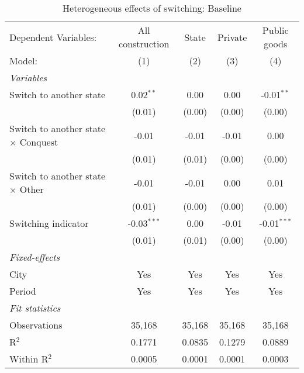 \begin{table}[htbp]
   \caption{\label{tab:baseline_10y} Heterogeneous effects of switching: Baseline}
   \centering
   \begin{tabular}{lcccc}
      \tabularnewline \midrule \midrule
      Dependent Variables:                       & All construction & State  & Private & Public goods\\  
      Model:                                     & (1)              & (2)    & (3)     & (4)\\  
      \midrule
      \emph{Variables}\\
      Switch to another state                    & 0.02$^{**}$      & 0.00   & 0.00    & -0.01$^{**}$\\   
                                                 & (0.01)           & (0.00) & (0.00)  & (0.00)\\   
      Switch to another state $\times$ Conquest  & -0.01            & -0.01  & -0.01   & 0.00\\   
                                                 & (0.01)           & (0.01) & (0.00)  & (0.00)\\   
      Switch to another state $\times$ Other     & -0.01            & -0.01  & 0.00    & 0.01\\   
                                                 & (0.01)           & (0.00) & (0.00)  & (0.00)\\   
      Switching indicator                        & -0.03$^{***}$    & 0.00   & -0.01   & -0.01$^{***}$\\   
                                                 & (0.01)           & (0.01) & (0.00)  & (0.00)\\   
      \midrule
      \emph{Fixed-effects}\\
      City                                       & Yes              & Yes    & Yes     & Yes\\  
      Period                                     & Yes              & Yes    & Yes     & Yes\\  
      \midrule
      \emph{Fit statistics}\\
      Observations                               & 35,168           & 35,168 & 35,168  & 35,168\\  
      R$^2$                                      & 0.1771           & 0.0835 & 0.1279  & 0.0889\\  
      Within R$^2$                               & 0.0005           & 0.0001 & 0.0001  & 0.0003\\  
      \midrule \midrule
      

\end{tabular}
\end{table}
